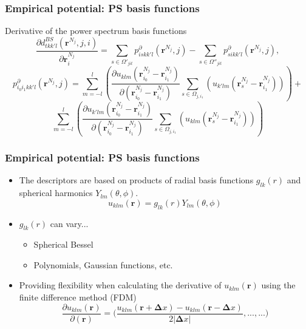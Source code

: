 \documentclass[10pt]{beamer}
\theoremstyle{remark}
\theoremstyle{definition}
\begin{document}
\begin{frame}
\frametitle{Empirical potential: PS basis functions}

Derivative of the power spectrum basis functions
\begin{equation*}
    \label{eq:derd}
    \frac{\partial d^{BS}_{tkk'l}(\bm r^{N_j}, j, i)}{\partial \bm r^{N_j}_i} = \sum_{s \in \Omega'_{jit}} p_{iskk'l}^{\partial}(\bm r^{N_j}, j) - \sum_{s \in \Omega''_{jit}} p_{sikk'l}^{\partial} ( \bm r^{N_j}, j),
\end{equation*}
\begin{equation*}
    p_{i_0i_1kk'l}^{\partial}(\bm r^{N_j}, j) = \sum_{m=-l}^l \left( \frac{\partial u_{klm}(\bm r_{i_0}^{N_j}- \bm r_{i_1}^{N_j})}{\partial (\bm r_{i_0}^{N_j}-\bm r_{i_1}^{N_j})} \sum_{s \in \Omega_{j,i_1}} \left( u_{k'lm} (\bm r^{N_j}_s- \bm r^{N_j}_{i_1}) \right) \right) + 
\end{equation*}
\begin{equation*}
\sum_{m=-l}^l \left( \frac{\partial u_{k'lm}(\bm r_{i_0}^{N_j}- \bm r_{i_1}^{N_j})}{\partial (\bm r_{i_0}^{N_j}- \bm r_{i_1}^{N_j})} \sum_{s \in \Omega_{j,i_1}} \left( u_{klm} (\bm r^{N_j}_s- \bm r^{N_j}_{i_1}) \right) \right)
\end{equation*}


\end{frame}
 
 

\begin{frame}
\frametitle{Empirical potential: PS basis functions}

\begin{itemize}
\item The descriptors are based on products of radial basis functions $g_{lk}(r)$ and spherical harmonics $Y_{lm}(\theta,\phi)$.
\begin{equation*}
u_{klm}(\bm r) =  g_{lk}(r) Y_{lm}(\theta,\phi)
\end{equation*}
\pause
\item $g_{lk}(r)$ can vary...
\begin{itemize}
    \item Spherical Bessel
    \item Polynomials, Gaussian functions, etc.
\end{itemize}
\pause
\item Providing flexibility when calculating the derivative of $u_{klm}(\bm r)$ using the finite difference method (FDM)
\begin{equation*}
     \frac{\partial u_{klm}(\bm r)}{\partial (\bm r)} =  
        \bigg( \frac{ u_{klm}(\bm r + \bm \Delta x) - u_{klm}(\bm r - \bm \Delta x) } {2 |\bm \Delta x|}, ..., ... \bigg)
\end{equation*}
\end{itemize}


\end{frame} 
 
\end{document}
